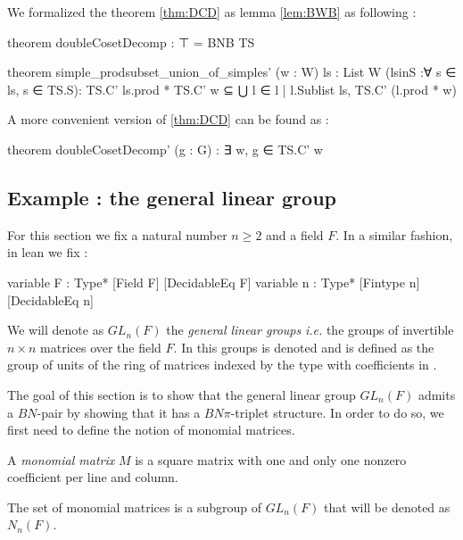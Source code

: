 We formalized the theorem \ref{thm:DCD} as lemma \ref{lem:BWB} as  following :
\begin{leancode}
theorem doubleCosetDecomp : ⊤ = BNB TS

theorem simple_prodsubset_union_of_simples' (w : W) {ls : List W} 
 (lsinS :∀ s ∈ ls, s ∈ TS.S): 
  TS.C' ls.prod * TS.C' w ⊆ ⋃ l ∈ { l | l.Sublist ls}, TS.C' (l.prod * w)
\end{leancode}

A more convenient version of \ref{thm:DCD} can be found as :
\begin{leancode}
theorem doubleCosetDecomp' (g : G) : ∃ w, g ∈ TS.C' w 
\end{leancode}



\subsection{Example : the general linear group}
\label{sub:GL}
For this section we fix a natural number $n \ge 2$ and a field $F$.
In a similar fashion, in lean we fix : 
\begin{leancode}
variable {F : Type*} [Field F] [DecidableEq F] 
variable {n : Type*} [Fintype n] [DecidableEq n] 
\end{leancode}

\begin{notation}
    We will denote as $GL_n(F)$ the \emph{general linear groups} \textit{i.e.} the groups of invertible $n \times n$ matrices over the field $F$. In \Lean this groups is denoted  and is defined as the group of units of the ring  of matrices indexed by the type  with coefficients in .
\end{notation} 

The goal of this section is to show that the general linear group $GL_n\left( F \right)$ admits a $BN$-pair by showing that it has a $BN\pi$-triplet structure. In order to do so, we first need to define the notion of monomial matrices.

\begin{definition}
    A \emph{monomial matrix} $M$ is a square matrix with one and only one nonzero coefficient per line and column.
\end{definition}

\begin{propriete} \label{prop:monomial}
    The set of monomial matrices is a subgroup of $GL_n\left( F \right)$ that will be denoted as $N_n(F)$.
\end{propriete}

